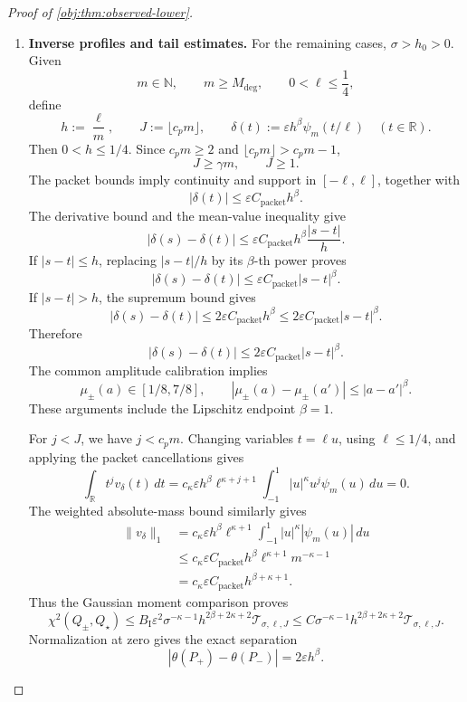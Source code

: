 \begin{proof}[Proof of \cref{obj:thm:observed-lower}]
\begin{enumerate}
\item \textbf{Inverse profiles and tail estimates.}
For the remaining cases, \(\sigma>h_0>0\). Given
\[
m\in\mathbb N,\qquad m\ge M_{\mathrm{deg}},\qquad
0<\ell\le\frac14,
\]
define
\[
h:=\frac{\ell}{m},\qquad
J:=\lfloor c_pm\rfloor,\qquad
\delta(t):=\varepsilon h^\beta\psi_m(t/\ell)
\quad(t\in\mathbb R).
\]
Then \(0<h\le1/4\). Since \(c_pm\ge2\) and
\(\lfloor c_pm\rfloor>c_pm-1\),
\[
J\ge\gamma m,\qquad J\ge1.
\]
The packet bounds imply continuity and support in \([-\ell,\ell]\), together with
\[
|\delta(t)|\le\varepsilon C_{\mathrm{packet}}h^\beta.
\]
The derivative bound and the mean-value inequality give
\[
|\delta(s)-\delta(t)|
\le\varepsilon C_{\mathrm{packet}}h^\beta\frac{|s-t|}{h}.
\]
If \(|s-t|\le h\), replacing \(|s-t|/h\) by its \(\beta\)-th power proves
\[
|\delta(s)-\delta(t)|
\le\varepsilon C_{\mathrm{packet}}|s-t|^\beta.
\]
If \(|s-t|>h\), the supremum bound gives
\[
|\delta(s)-\delta(t)|
\le2\varepsilon C_{\mathrm{packet}}h^\beta
\le2\varepsilon C_{\mathrm{packet}}|s-t|^\beta.
\]
Therefore
\[
|\delta(s)-\delta(t)|
\le2\varepsilon C_{\mathrm{packet}}|s-t|^\beta.
\]
The common amplitude calibration implies
\[
\mu_\pm(a)\in[1/8,7/8],\qquad
|\mu_\pm(a)-\mu_\pm(a')|\le|a-a'|^\beta.
\]
These arguments include the Lipschitz endpoint \(\beta=1\).

For \(j<J\), we have \(j<c_pm\). Changing variables \(t=\ell u\), using \(\ell\le1/4\), and applying the packet cancellations gives
\[
\int_{\mathbb R}t^jv_\delta(t)\,dt
=
c_\kappa\varepsilon h^\beta\ell^{\kappa+j+1}
\int_{-1}^{1}|u|^\kappa u^j\psi_m(u)\,du
=0.
\]
The weighted absolute-mass bound similarly gives
\[
\begin{aligned}
\|v_\delta\|_1
&=
c_\kappa\varepsilon h^\beta\ell^{\kappa+1}
\int_{-1}^{1}|u|^\kappa|\psi_m(u)|\,du\\
&\le
c_\kappa\varepsilon C_{\mathrm{packet}}
h^\beta\ell^{\kappa+1}m^{-\kappa-1}\\
&=
c_\kappa\varepsilon C_{\mathrm{packet}}h^{\beta+\kappa+1}.
\end{aligned}
\]
Thus the Gaussian moment comparison proves
\[
\chi^2(Q_\pm,Q_\star)
\le
B_{\mathrm I}\varepsilon^2
\sigma^{-\kappa-1}h^{2\beta+2\kappa+2}
\mathcal T_{\sigma,\ell,J}
\le
C\sigma^{-\kappa-1}h^{2\beta+2\kappa+2}
\mathcal T_{\sigma,\ell,J}.
\]
Normalization at zero gives the exact separation
\[
|\theta(P_+)-\theta(P_-)|
=2\varepsilon h^\beta.
\]


\end{enumerate}
\end{proof}
